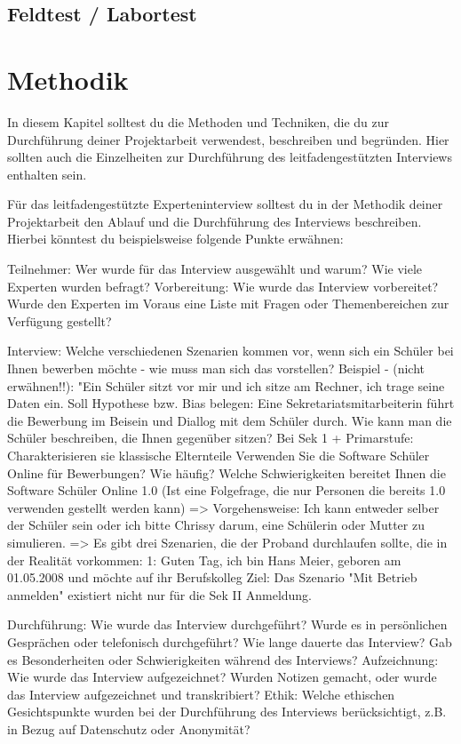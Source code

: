 \subsection{Feldtest / Labortest}


\section{Methodik}
In diesem Kapitel solltest du die Methoden und Techniken, die du zur Durchführung deiner Projektarbeit verwendest, beschreiben und begründen. Hier sollten auch die Einzelheiten zur Durchführung des leitfadengestützten Interviews enthalten sein.

Für das leitfadengestützte Experteninterview solltest du in der Methodik deiner Projektarbeit den Ablauf und die Durchführung des Interviews beschreiben. Hierbei könntest du beispielsweise folgende Punkte erwähnen:

Teilnehmer: Wer wurde für das Interview ausgewählt und warum? Wie viele Experten wurden befragt?
Vorbereitung: Wie wurde das Interview vorbereitet? Wurde den Experten im Voraus eine Liste mit Fragen oder Themenbereichen zur Verfügung gestellt?

Interview: Welche verschiedenen Szenarien kommen vor, wenn sich ein Schüler bei Ihnen bewerben möchte - wie muss man sich das vorstellen?
Beispiel - (nicht erwähnen!!): "Ein Schüler sitzt vor mir und ich sitze am Rechner, ich trage seine Daten ein.
Soll Hypothese bzw. Bias belegen: Eine Sekretariatsmitarbeiterin führt die Bewerbung im Beisein und Diallog mit dem Schüler durch.
Wie kann man die Schüler beschreiben, die Ihnen gegenüber sitzen?
Bei Sek 1 + Primarstufe: Charakterisieren sie klassische Elternteile
Verwenden Sie die Software Schüler Online für Bewerbungen?
Wie häufig?
Welche Schwierigkeiten bereitet Ihnen die Software Schüler Online 1.0 (Ist eine Folgefrage, die nur Personen die bereits 1.0 verwenden gestellt werden kann)
=> Vorgehensweise: Ich kann entweder selber der Schüler sein oder ich bitte Chrissy darum, eine Schülerin oder Mutter zu simulieren.
=> Es gibt drei Szenarien, die der Proband durchlaufen sollte, die in der Realität vorkommen:
    1: Guten Tag, ich bin Hans Meier, geboren am 01.05.2008 und möchte auf ihr Berufskolleg
    Ziel: 
    Das Szenario "Mit Betrieb anmelden" existiert nicht nur für die Sek II Anmeldung.

Durchführung: Wie wurde das Interview durchgeführt? Wurde es in persönlichen Gesprächen oder telefonisch durchgeführt? Wie lange dauerte das Interview? Gab es Besonderheiten oder Schwierigkeiten während des Interviews?
Aufzeichnung: Wie wurde das Interview aufgezeichnet? Wurden Notizen gemacht, oder wurde das Interview aufgezeichnet und transkribiert?
Ethik: Welche ethischen Gesichtspunkte wurden bei der Durchführung des Interviews berücksichtigt, z.B. in Bezug auf Datenschutz oder Anonymität?


